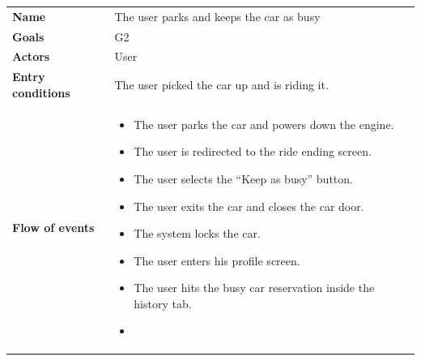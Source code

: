\documentclass[]{article}
\providecommand{\tightlist}{%
  \setlength{\itemsep}{0pt}\setlength{\parskip}{0pt}}
\begin{document}
\begin{longtable}[]{@{}ll@{}}
\toprule
\begin{minipage}[t]{0.29\columnwidth}\raggedright\strut
\textbf{Name}\strut
\end{minipage} & \begin{minipage}[t]{0.65\columnwidth}\raggedright\strut
The user parks and keeps the car as busy\strut
\end{minipage}\tabularnewline
\begin{minipage}[t]{0.29\columnwidth}\raggedright\strut
\textbf{Goals}\strut
\end{minipage} & \begin{minipage}[t]{0.65\columnwidth}\raggedright\strut
G2\strut
\end{minipage}\tabularnewline
\begin{minipage}[t]{0.29\columnwidth}\raggedright\strut
\textbf{Actors}\strut
\end{minipage} & \begin{minipage}[t]{0.65\columnwidth}\raggedright\strut
User\strut
\end{minipage}\tabularnewline
\begin{minipage}[t]{0.29\columnwidth}\raggedright\strut
\textbf{Entry conditions}\strut
\end{minipage} & \begin{minipage}[t]{0.65\columnwidth}\raggedright\strut
The user picked the car up and is riding it.\strut
\end{minipage}\tabularnewline
\begin{minipage}[t]{0.29\columnwidth}\raggedright\strut
\textbf{Flow of events}\strut
\end{minipage} & \begin{minipage}[t]{0.65\columnwidth}\raggedright\strut
\begin{itemize}
\tightlist
\item
  The user parks the car and powers down the engine.
\item
  The user is redirected to the ride ending screen.
\item
  The user selects the ``Keep as busy'' button.
\item
  The user exits the car and closes the car door.
\item
  The system locks the car.
\item
  The user enters his profile screen.
\item
  The user hits the busy car reservation inside the history tab.
\item

\end{itemize}
\end{minipage}
\end{longtable}
\end{document}
